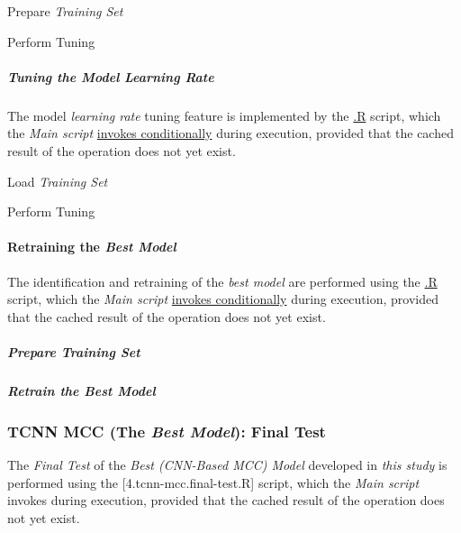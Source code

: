 \documentclass[
]{report}
\begin{document}
Prepare \emph{Training Set}

\hfill\break

Perform Tuning

\hfill\break

\subparagraph{\texorpdfstring{Tuning the Model \emph{Learning Rate}}{Tuning the Model Learning Rate}}\label{tcnn.lr.tuning}

\hfill\break

The model \emph{learning rate} tuning feature is implemented by the \href{}{.R} script, which the \emph{Main script} \href{https://github.com/AzKurban-edX-DS/edx.capstone.choose-your-own/blob/main/r/index.R\#L}{invokes conditionally} during execution, provided that the cached result of the operation does not yet exist.

Load \emph{Training Set}

\hfill\break

Perform Tuning

\hfill\break

\paragraph{\texorpdfstring{Retraining the \emph{Best Model}}{Retraining the Best Model}}\label{tcnn.retraining_best}

\hfill\break

The identification and retraining of the \emph{best model} are performed using the \href{}{.R} script, which the \emph{Main script} \href{https://github.com/AzKurban-edX-DS/edx.capstone.choose-your-own/blob/main/r/index.R\#L}{invokes conditionally} during execution, provided that the cached result of the operation does not yet exist.

\subparagraph{\texorpdfstring{Prepare \emph{Training Set}}{Prepare Training Set}}\label{tcnn.best.retrain.train_set}

\hfill\break

\subparagraph{\texorpdfstring{Retrain the \emph{Best Model}}{Retrain the Best Model}}\label{tcnn.best.retrain}

\hfill\break

\subsubsection{\texorpdfstring{TCNN MCC (The \emph{Best Model}): Final Test}{TCNN MCC (The Best Model): Final Test}}\label{tcnn.final_test}

The \emph{Final Test} of the \emph{Best (CNN-Based MCC) Model} developed in \emph{this study} is performed using the {[}4.tcnn-mcc.final-test.R{]} script, which the \emph{Main script} invokes during execution, provided that the cached result of the operation does not yet exist.
\end{document}
